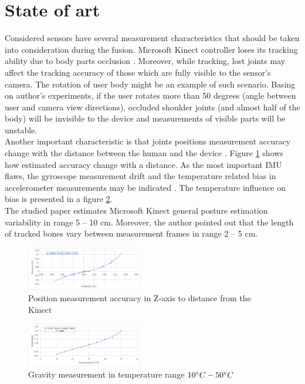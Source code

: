 \documentclass[9pt]{llncs}
\begin{document}
\section{State of art}
Considered sensors have several measurement characteristics that should be taken into consideration during the fusion. Microsoft Kinect controller loses its tracking ability due to body parts occlusion \cite{Asteriadis2013}. Moreover, while tracking, lost joints may affect the tracking accuracy of those which are fully visible to the sensor's camera. The rotation of user body might be an example of such scenario. Basing on author's experiments, if the user rotates more than 50 degrees (angle between user and camera view directions), occluded shoulder joints (and almost half of the body) will be invisible to the device and measurements of visible parts will be unstable.\\
Another important characteristic is that joints positions measurement accuracy change with the distance between the human and the device \cite{Khoshelham2012}. Figure  \ref{fig:kinectDist} shows how estimated accuracy change with a distance. As the most important IMU flaws, the gyroscope measurement drift and the temperature related bias in accelerometer measurements may be indicated \cite{Woodman2007,Nikolic2013}. The temperature influence on bias is presented in a figure \ref{fig:imuTemp}.\\ 
The studied paper \cite{Obdrzalek2012} estimates Microsoft Kinect general posture estimation variability in range 5 -- 10 cm. Moreover, the author pointed out that the length of tracked bones vary between measurement frames in range 2 -- 5 cm.\\

\begin{figure}[H]
	\centering   
	\includegraphics[width=0.45\textwidth]{Fig01.eps}
	\caption{Position measurement accuracy in Z-axis to distance from the Kinect}
	\label{fig:kinectDist}
\end{figure}

\begin{figure}[H]
	\centering 
	\includegraphics[width=0.45\textwidth]{Fig02.eps}
	\caption{Gravity measurement in temperature range $10\degree C - 50\degree C$}
	\label{fig:imuTemp}
\end{figure}
\end{document}
